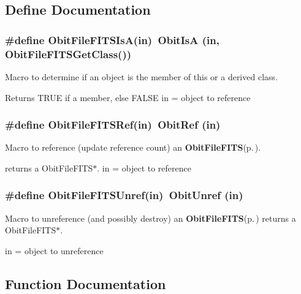 \subsection{Define Documentation}
\subsubsection{\setlength{\rightskip}{0pt plus 5cm}\#define Obit\-File\-FITSIs\-A(in)\ Obit\-Is\-A (in, Obit\-File\-FITSGet\-Class())}\label{ObitFileFITS_8h_a2}


Macro to determine if an object is the member of this or a derived class. 

Returns TRUE if a member, else FALSE in = object to reference 
\subsubsection{\setlength{\rightskip}{0pt plus 5cm}\#define Obit\-File\-FITSRef(in)\ Obit\-Ref (in)}\label{ObitFileFITS_8h_a1}


Macro to reference (update reference count) an {\bf Obit\-File\-FITS}{\rm (p.\,\pageref{structObitFileFITS})}. 

returns a Obit\-File\-FITS$\ast$. in = object to reference 
\subsubsection{\setlength{\rightskip}{0pt plus 5cm}\#define Obit\-File\-FITSUnref(in)\ Obit\-Unref (in)}\label{ObitFileFITS_8h_a0}


Macro to unreference (and possibly destroy) an {\bf Obit\-File\-FITS}{\rm (p.\,\pageref{structObitFileFITS})} returns a Obit\-File\-FITS$\ast$. 

in = object to unreference 

\subsection{Function Documentation}
